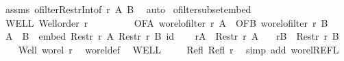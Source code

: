 \begin{isabellebody}
\ assms\ ofilter{\isacharunderscore}{\kern0pt}Restr{\isacharunderscore}{\kern0pt}Int{\isacharbrackleft}{\kern0pt}of\ r\ A\ B{\isacharbrackright}{\kern0pt}\ \isamarkupfalse%
\ auto\isanewline
{}\isamarkupfalse%
%
\endisatagproof
{\isafoldproof}%
%
\isadelimproof
\isanewline
%
\endisadelimproof
\isanewline
{}\isamarkupfalse%
\ ofilter{\isacharunderscore}{\kern0pt}subset{\isacharunderscore}{\kern0pt}embed{\isacharcolon}{\kern0pt}\isanewline
{}\ WELL{\isacharcolon}{\kern0pt}\ {\isachardoublequoteopen}Well{\isacharunderscore}{\kern0pt}order\ r{\isachardoublequoteclose}\ \isanewline
\ \ \ \ \ \ \ \ OFA{\isacharcolon}{\kern0pt}\ {\isachardoublequoteopen}wo{\isacharunderscore}{\kern0pt}rel{\isachardot}{\kern0pt}ofilter\ r\ A{\isachardoublequoteclose}\ \ OFB{\isacharcolon}{\kern0pt}\ {\isachardoublequoteopen}wo{\isacharunderscore}{\kern0pt}rel{\isachardot}{\kern0pt}ofilter\ r\ B{\isachardoublequoteclose}\isanewline
{}\ {\isachardoublequoteopen}{\isacharparenleft}{\kern0pt}A\ {\isasymle}\ B{\isacharparenright}{\kern0pt}\ {\isacharequal}{\kern0pt}\ {\isacharparenleft}{\kern0pt}embed\ {\isacharparenleft}{\kern0pt}Restr\ r\ A{\isacharparenright}{\kern0pt}\ {\isacharparenleft}{\kern0pt}Restr\ r\ B{\isacharparenright}{\kern0pt}\ id{\isacharparenright}{\kern0pt}{\isachardoublequoteclose}\isanewline
%
\isadelimproof
%
\endisadelimproof
%
\isatagproof
{}\isamarkupfalse%
{\isacharminus}{\kern0pt}\isanewline
\ \ \isamarkupfalse%
\ {\isacharquery}{\kern0pt}rA\ {\isacharequal}{\kern0pt}\ {\isachardoublequoteopen}Restr\ r\ A{\isachardoublequoteclose}\ \ \isamarkupfalse%
\ {\isacharquery}{\kern0pt}rB\ {\isacharequal}{\kern0pt}\ {\isachardoublequoteopen}Restr\ r\ B{\isachardoublequoteclose}\isanewline
\ \ \isamarkupfalse%
\ Well{\isacharcolon}{\kern0pt}\ {\isachardoublequoteopen}wo{\isacharunderscore}{\kern0pt}rel\ r{\isachardoublequoteclose}\ \isamarkupfalse%
\ wo{\isacharunderscore}{\kern0pt}rel{\isacharunderscore}{\kern0pt}def\ \isamarkupfalse%
\ WELL\ \isacommand{{\isachardot}{\kern0pt}}\isamarkupfalse%
\isanewline
\ \ \isamarkupfalse%
\ Refl{\isacharcolon}{\kern0pt}\ {\isachardoublequoteopen}Refl\ r{\isachardoublequoteclose}\ \isamarkupfalse%
\ {\isacharparenleft}{\kern0pt}simp\ add{\isacharcolon}{\kern0pt}\ wo{\isacharunderscore}{\kern0pt}rel{\isachardot}{\kern0pt}REFL{\isacharparenright}{\kern0pt}\isanewline
\ \ \isamarkupfalse%

\end{isabellebody}
